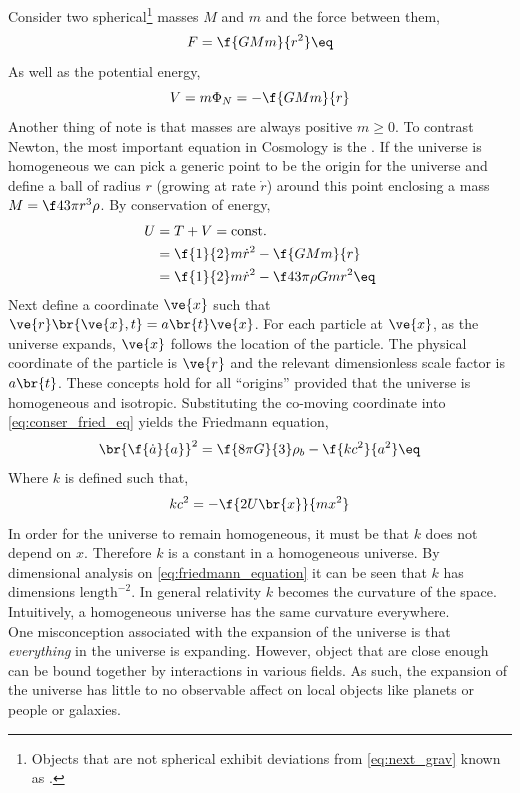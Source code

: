 \documentclass{article}
\begin{document}
Consider two spherical\footnote{Objects that are not spherical exhibit deviations from \cref{eq:next_grav} known as .} masses $M$ and $m$ and the force between them,
\[ F = \f{G M m}{r^2} \eq \label{eq:next_grav} \]
As well as the potential energy,
\[ V = m \Phi_N = -\f{GMm}{r} \]
Another thing of note is that masses are always positive $m \geq 0$. To contrast Newton, the most important equation in Cosmology is the . If the universe is homogeneous we can pick a generic point to be the origin for the universe and define a ball of radius $r$ (growing at rate $\dot{r}$) around this point enclosing a mass $M = \f43 \pi r^3 \rho$. By conservation of energy,
\begin{align*}
U &= T + V = \text{const.} \\
&= \f{1}{2} m \dot{r}^2 - \f{GMm}{r} \\
&= \f{1}{2} m \dot{r}^2 - \f43 \pi \rho G m r^2 \eq \label{eq:conser_fried_eq}
\end{align*}
Next define a  coordinate $\ve{x}$ such that $\ve{r}\br{\ve{x}, t} = a\br{t} \ve{x}$. For each particle at $\ve{x}$, as the universe expands, $\ve{x}$ follows the location of the particle. The physical coordinate of the particle is $\ve{r}$ and the relevant dimensionless scale factor is $a\br{t}$. These concepts hold for all ``origins'' provided that the universe is homogeneous and isotropic. Substituting the co-moving coordinate into \cref{eq:conser_fried_eq} yields the Friedmann equation,
\[ \br{\f{\dot{a}}{a}}^2 = \f{8 \pi G}{3} \rho_b - \f{k c^2}{a^2} \eq \label{eq:friedmann_equation} \]
Where $k$ is defined such that,
\[ k c^2 = - \f{2 U\br{x}}{m x^2} \]
In order for the universe to remain homogeneous, it must be that $k$ does not depend on $x$. Therefore $k$ is a constant in a homogeneous universe. By dimensional analysis on \cref{eq:friedmann_equation} it can be seen that $k$ has dimensions $\text{length}^{-2}$. In general relativity $k$ becomes the curvature of the space. Intuitively, a homogeneous universe has the same curvature everywhere. \\

One misconception associated with the expansion of the universe is that \textit{everything} in the universe is expanding. However, object that are close enough can be bound together by interactions in various fields. As such, the expansion of the universe has little to no observable affect on local objects like planets or people or galaxies. \\
\end{document}
